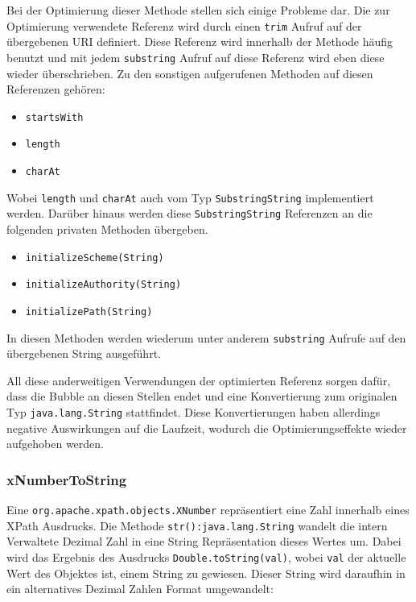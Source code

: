 Bei der Optimierung dieser Methode stellen sich einige Probleme dar. Die zur 
Optimierung verwendete Referenz wird durch einen \texttt{trim} Aufruf auf der
übergebenen URI definiert. Diese Referenz wird innerhalb der Methode häufig benutzt
und mit jedem \texttt{substring} Aufruf auf diese Referenz wird eben diese wieder 
überschrieben. Zu den sonstigen aufgerufenen Methoden auf diesen Referenzen gehören:

\begin{itemize}
  	\item \texttt{startsWith}
  	\item \texttt{length}
  	\item \texttt{charAt} 
\end{itemize}  

Wobei \texttt{length} und \texttt{charAt} auch vom Typ \texttt{SubstringString}
implementiert werden. Darüber hinaus werden diese \texttt{SubstringString} Referenzen
an die folgenden privaten Methoden übergeben. 

\begin{itemize}
 	\item \texttt{initializeScheme(String)}
 	\item \texttt{initializeAuthority(String)}
 	\item \texttt{initializePath(String)}
\end{itemize} 

In diesen Methoden werden wiederum unter anderem \texttt{substring} Aufrufe auf 
den übergebenen String ausgeführt.

All diese anderweitigen Verwendungen der optimierten Referenz sorgen dafür, dass die
Bubble an diesen Stellen endet und eine Konvertierung zum originalen Typ 
\texttt{java.lang.String} stattfindet. Diese Konvertierungen haben allerdings negative 
Auswirkungen auf die Laufzeit, wodurch die Optimierungseffekte wieder aufgehoben werden.    

\subsubsection{xNumberToString}

Eine \texttt{org.apache.xpath.objects.XNumber} repräsentiert eine Zahl innerhalb eines
XPath Ausdrucks. Die Methode \texttt{str():java.lang.String} wandelt die intern Verwaltete
Dezimal Zahl in eine String Repräsentation dieses Wertes um. Dabei wird das Ergebnis
des Ausdrucks \texttt{Double.toString(val)}, wobei \texttt{val} der aktuelle Wert des
Objektes ist, einem String zu gewiesen. Dieser String wird daraufhin in ein alternatives
Dezimal Zahlen Format umgewandelt: 


